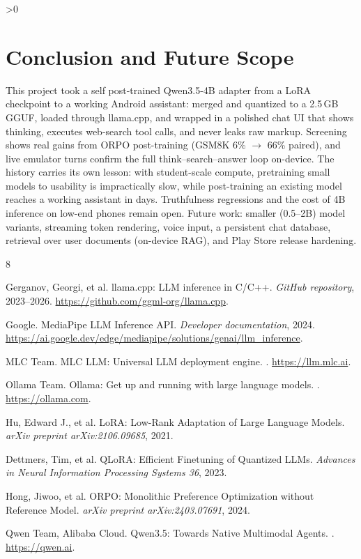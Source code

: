 \documentclass[12pt,a4paper]{report}
\let\oldchapter\chapter
\renewcommand{\chapter}{\ifnum\value{chapter}>0 \clearpage\pagestyle{fancy}\fi\oldchapter}
\begin{document}
\chapter{Conclusion and Future Scope}
This project took a self post-trained Qwen3.5-4B adapter from a LoRA
checkpoint to a working Android assistant: merged and quantized to a
2.5\,GB GGUF, loaded through llama.cpp, and wrapped in a polished
chat UI that shows thinking, executes web-search tool calls, and never
leaks raw markup. Screening shows real gains from ORPO post-training
(GSM8K 6\% $\rightarrow$ 66\% paired), and live emulator turns confirm
the full think--search--answer loop on-device. The history carries its own
lesson: with student-scale compute, pretraining small models to
usability is impractically slow, while post-training an existing model
reaches a working assistant in days. Truthfulness regressions
and the cost of 4B inference on low-end phones remain open. Future
work: smaller (0.5--2B) model variants, streaming token rendering,
voice input, a persistent chat database, retrieval over user documents
(on-device RAG), and Play Store release hardening.

\begin{thebibliography}{8}

Gerganov, Georgi, et al.
\newblock llama.cpp: LLM inference in C/C++.
\newblock \emph{GitHub repository}, 2023--2026. \url{https://github.com/ggml-org/llama.cpp}.

Google.
\newblock MediaPipe LLM Inference API.
\newblock \emph{Developer documentation}, 2024. \url{https://ai.google.dev/edge/mediapipe/solutions/genai/llm_inference}.

MLC Team.
\newblock MLC LLM: Universal LLM deployment engine.
. \url{https://llm.mlc.ai}.

Ollama Team.
\newblock Ollama: Get up and running with large language models.
. \url{https://ollama.com}.

Hu, Edward J., et al.
\newblock LoRA: Low-Rank Adaptation of Large Language Models.
\newblock \emph{arXiv preprint arXiv:2106.09685}, 2021.

Dettmers, Tim, et al.
\newblock QLoRA: Efficient Finetuning of Quantized LLMs.
\newblock \emph{Advances in Neural Information Processing Systems 36}, 2023.

Hong, Jiwoo, et al.
\newblock ORPO: Monolithic Preference Optimization without Reference Model.
\newblock \emph{arXiv preprint arXiv:2403.07691}, 2024.

Qwen Team, Alibaba Cloud.
\newblock Qwen3.5: Towards Native Multimodal Agents.
. \url{https://qwen.ai}.

\end{thebibliography}
\end{document}
